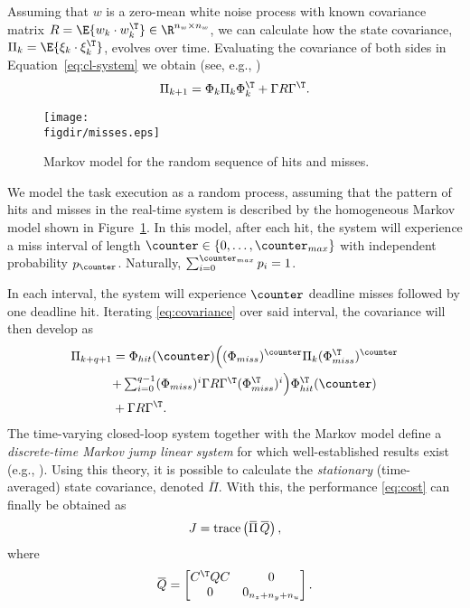 Assuming that $w$ is a zero-mean white noise process with known covariance matrix $R = \E{w_k \cdot w_k^{\T}} \in \R^{n_w \times n_w}$, we can calculate how the state covariance, $\Pi_k = \E{\xi_k\cdot \xi_k^{\T}}$, evolves over time. Evaluating the covariance of both sides in 
Equation~\eqref{eq:cl-system} we obtain (see, e.g., \cite{AstWit:1984})
\begin{equation}
\label{eq:covariance}
    \Pi_{k+1} = \Phi_k \Pi_k \Phi_k^{\T} + \Gamma R \Gamma^{\T} .
\end{equation}

\begin{figure}[t]
    \centerline{\texttt{[image: \\figdir/misses.eps]}}
    \caption{Markov model for the random sequence of hits and misses.}
    \label{fig:Markov}
\end{figure}

We model the task execution as a random process, assuming that the pattern of hits and misses in the real-time system is described by the homogeneous Markov model shown in Figure~\ref{fig:Markov}.
In this model, after each hit, the system will experience a miss interval of length $\counter \in \{0,\ldots,\counter_{max}\}$ with independent probability $p_\counter$. Naturally, $\sum_{i=0}^{\counter_{max}} p_i = 1$.

In each interval, the system will experience $\counter$ deadline misses followed by one deadline hit. Iterating \eqref{eq:covariance} over said interval, the covariance will then develop as
\begin{equation*}
    \label{eq:intervalP}
    \begin{aligned}
    \Pi_{k+q+1} &= \Phi_{hit}(\counter)  \Bigl((\Phi_{miss})^\counter \Pi_k (\Phi_{miss}^{\T})^\counter \Bigr.\\
    &\Bigl.+ \textstyle\sum_{i=0}^{q-1} (\Phi_{miss})^i \Gamma R \Gamma^{\T} (\Phi_{miss}^{\T})^i \Bigr)\Phi_{hit}^{\T}(\counter)  \\
    &+ \Gamma R \Gamma^{\T} .
    \end{aligned}
\end{equation*}
The time-varying closed-loop system together with the Markov model define a \emph{discrete-time Markov jump linear system} for which well-established results exist (e.g., \cite{Blair:1975,Nilsson:1998,Lincoln:2002}). Using this theory, it is possible to calculate the \emph{stationary} (time-averaged) state covariance, denoted $\overbar\Pi$. With this, the performance \eqref{eq:cost} can finally be obtained as
\begin{equation*}
    J = \operatorname{trace} \funof{ \overbar{\Pi} \, \overbar{Q} },
\end{equation*}
where
\begin{equation*}
    \overbar{Q} = \begin{bmatrix}
    C^{\T}Q C & 0 \\ 0 & 0_{n_z+n_y+n_u}
    \end{bmatrix}.
\end{equation*}

